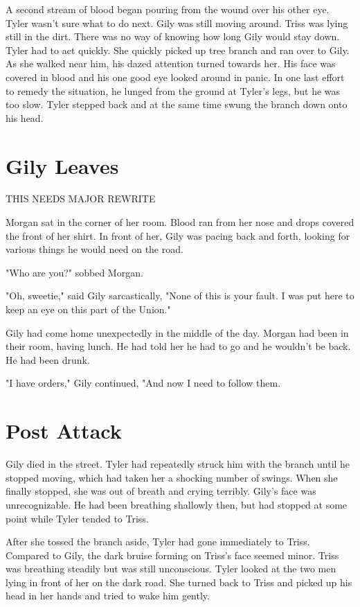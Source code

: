 \documentclass[courier]{sffms}
\begin{document}
A second stream of blood began pouring from
the wound over his other eye. Tyler wasn't
sure what to do next. Gily was still moving around.
Triss was lying still in the dirt. There was no way
of knowing how long Gily would stay down.
Tyler had to act quickly. She quickly picked up
tree branch and ran over to Gily. As she walked
near him, his dazed attention turned towards
her. His face was covered in blood and his one
good eye looked around in panic. In one last
effort to remedy the situation, he lunged from
the ground at Tyler's legs, but he was too slow.
Tyler stepped back and at the same time swung
the branch down onto his head.

\chapter{Gily Leaves}
THIS NEEDS MAJOR REWRITE

Morgan sat in the corner of her room. Blood
ran from her nose and drops covered the front
of her shirt. In front of her, Gily was pacing
back and forth, looking for various things he
would need on the road.

"Who are you?" sobbed Morgan.

"Oh, sweetie," said Gily sarcastically, "None of this
is your fault. I was put here to keep an eye on
this part of the Union."

Gily had come home unexpectedly in the middle
of the day. Morgan had been in their room,
having lunch. He had told her he had to go and
he wouldn't be back. He had been drunk.

"I have orders," Gily continued, "And now I need
to follow them.

\chapter{Post Attack}
Gily died in the street. Tyler had repeatedly struck
him with the branch until he stopped moving,
which had taken her a shocking number of
swings. When she finally stopped, she was out of
breath and crying terribly. Gily's face was
unrecognizable. He had been breathing shallowly
then, but had stopped at some point while Tyler
tended to Triss.

After she tossed the branch aside, Tyler had gone
immediately to Triss. Compared to Gily, the dark
bruise forming on Triss's face seemed minor. Triss
was breathing steadily but was still unconscious.
Tyler looked at the two men lying in front of her
on the dark road. She turned back to Triss and
picked up his head in her hands and tried to wake
him gently.
\end{document}
